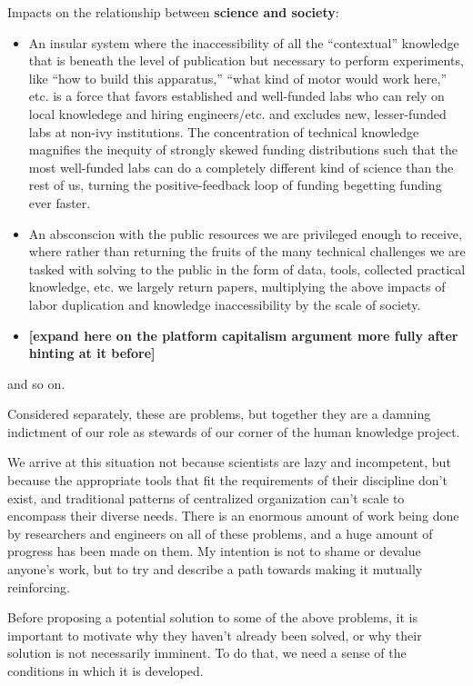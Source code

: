 \documentclass{article}
\begin{document}
Impacts on the relationship between \textbf{science and society}:

\begin{itemize}

\item
  An insular system where the inaccessibility of all the ``contextual''
  knowledge \cite{woolKnowledgeNetworksHow2020,
  barleyBackroomsScienceWork1994} that is beneath the level of
  publication but necessary to perform experiments, like ``how to build
  this apparatus,'' ``what kind of motor would work here,'' etc. is a
  force that favors established and well-funded labs who can rely on
  local knowledege and hiring engineers/etc. and excludes new,
  lesser-funded labs at non-ivy institutions. The concentration of
  technical knowledge magnifies the inequity of strongly skewed funding
  distributions such that the most well-funded labs can do a completely
  different kind of science than the rest of us, turning the
  positive-feedback loop of funding begetting funding ever faster.
\item
  An absconscion with the public resources we are privileged enough to
  receive, where rather than returning the fruits of the many technical
  challenges we are tasked with solving to the public in the form of
  data, tools, collected practical knowledge, etc. we largely return
  papers, multiplying the above impacts of labor duplication and
  knowledge inaccessibility by the scale of society.
\item
  \textbf{{[}expand here on the platform capitalism argument more fully
  after hinting at it before{]}}
\end{itemize}

and so on.

Considered separately, these are problems, but together they are a
damning indictment of our role as stewards of our corner of the human
knowledge project.

We arrive at this situation not because scientists are lazy and
incompetent, but because the appropriate tools that fit the requirements
of their discipline don't exist, and traditional patterns of centralized
organization can't scale to encompass their diverse needs. There is an
enormous amount of work being done by researchers and engineers on all
of these problems, and a huge amount of progress has been made on them.
My intention is not to shame or devalue anyone's work, but to try and
describe a path towards making it mutually reinforcing.

Before proposing a potential solution to some of the above problems, it
is important to motivate why they haven't already been solved, or why
their solution is not necessarily imminent. To do that, we need a sense
of the conditions in which it is developed.
\end{document}

